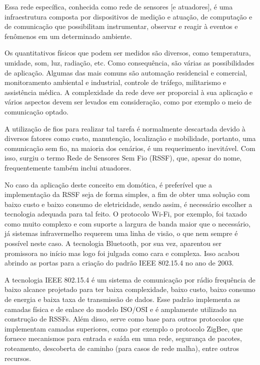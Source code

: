 \documentclass[
    12pt,               %
    a4paper,            %
    english,            %
    brazil,             %
    ]{article}
\begin{document}
Essa rede específica, conhecida como rede de sensores [e atuadores], é uma infraestrutura composta por dispositivos de medição e
atuação, de computação e de comunicação que possibilitam instrumentar, observar e reagir à eventos e fenômenos em um determinado
ambiente. \cite{sohraby_minoli_znati2007}

Os quantitativos físicos que podem ser medidos são diversos, como temperatura, umidade, som, luz, radiação, etc. Como
consequência, são várias as possibilidades de aplicação. Algumas das mais comuns são automação residencial e comercial,
monitoramento ambiental e industrial, controle de tráfego, militarismo e assistência médica. A complexidade da rede deve ser
proporcial à sua aplicação e vários aspectos devem ser levados em consideração, como por exemplo o meio de comunicação optado.
\cite{kuorilehto2007}

A utilização de fios para realizar tal tarefa é normalmente descartada devido à diversos fatores como custo, manutenção,
localização e mobilidade, portanto, uma comunicação sem fio, na maioria dos cenários, é um requerimento inevitável. Com isso,
surgiu o termo Rede de Sensores Sem Fio (RSSF), que, apesar do nome, frequentemente também inclui atuadores.
\cite{karl_willig2005}

No caso da aplicação deste conceito em domótica, é preferível que a implementação da RSSF seja de forma simples, a fim de obter
uma solução com baixo custo e baixo consumo de eletricidade, sendo assim, é necessário escolher a tecnologia adequada para tal
feito. O protocolo Wi-Fi, por exemplo, foi taxado como muito complexo e com suporte a largura de banda maior que o necessário, já
sistemas infravermelho requerem uma linha de visão, o que nem sempre é possível neste caso. A tecnologia Bluetooth, por sua vez,
aparentou ser promissora no início mas logo foi julgada como cara e complexa. Isso acabou abrindo as portas para a criação do
padrão IEEE 802.15.4 no ano de 2003.  \cite{sohraby_minoli_znati2007}

A tecnologia IEEE 802.15.4 é um sistema de comunicação por rádio frequência de baixo alcance projetado para ter baixa
complexidade, baixo custo, baixo consumo de energia e baixa taxa de transmissão de dados. Esse padrão implementa as camadas física
e de enlace do modelo ISO/OSI e é amplamente utilizado na construção de RSSFs. Além disso, serve como base para outros protocolos
que implementam camadas superiores, como por exemplo o protocolo ZigBee, que fornece mecanismos para entrada e saída em uma rede,
segurança de pacotes, roteamento, descoberta de caminho (para casos de rede malha), entre outros recursos. \cite{buratti2011}
\end{document}
